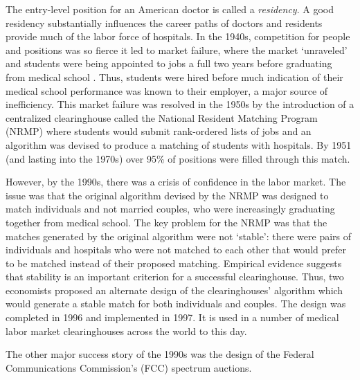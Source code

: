 \begin{example}
    The entry-level position for an American doctor is called a \textit{residency}. A good residency substantially influences the career paths of doctors and residents provide much of the labor force of hospitals. In the 1940s, competition for people and positions was so fierce it led to market failure, where the market `unraveled' and students were being appointed to jobs a full two years before graduating from medical school \autocite[p1346]{roth2002}. Thus, students were hired before much indication of their medical school performance was known to their employer, a major source of inefficiency. This market failure was resolved in the 1950s by the introduction of a centralized clearinghouse called the National Resident Matching Program (NRMP) where students would submit rank-ordered lists of jobs and an algorithm was devised to produce a matching of students with hospitals. By 1951 (and lasting into the 1970s) over 95\% of positions were filled through this match.

    However, by the 1990s, there was a crisis of confidence in the labor market. The issue was that the original algorithm devised by the NRMP was designed to match individuals and not married couples, who were increasingly graduating together from medical school. The key problem for the NRMP was that the matches generated by the original algorithm were not `stable': there were pairs of individuals and hospitals who were not matched to each other that would prefer to be matched instead of their proposed matching. Empirical evidence suggests that stability is an important criterion for a successful clearinghouse. Thus, two economists \autocite{roth1999} proposed an alternate design of the clearinghouses' algorithm which would generate a stable match for both individuals and couples. The design was completed in 1996 and implemented in 1997. It is used in a number of medical labor market clearinghouses across the world to this day.
\end{example}

\noindent The other major success story of the 1990s was the design of the Federal Communications Commission's (FCC) spectrum auctions.

